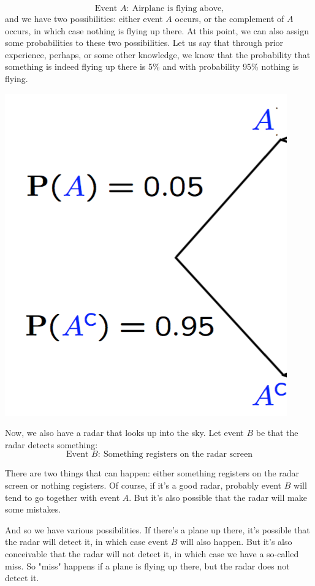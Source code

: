 \documentclass{tufte-handout}
\begin{document}
$$
\text{Event } A: \ \text{Airplane is flying above,}
$$
and we have two possibilities: either event $A$ occurs,
or the complement of $A$ occurs, in which case nothing is flying up there. At this point, we can also assign
some probabilities to these two possibilities. Let us say that through prior experience, perhaps, or some
other knowledge, we know that the probability that something is indeed flying up there is 5\% and with
probability 95\% nothing is flying.


\begin{marginfigure}
  \includegraphics{AirplaneTree1}
\end{marginfigure}


\vspace{0.2cm}
Now, we also have a radar that looks up into the sky. Let event $B$ be that the radar detects something:
$$
\text{Event } B: \ \text{Something registers on the radar screen}
$$

There are two things that can happen:  either
something registers on the radar screen or nothing registers. Of course, if it's a good radar, probably
event $B$ will tend to go together with event $A$. But it's also possible that the radar will make some
mistakes.


And so we have various possibilities. If there's a plane up there, it's possible that the radar will detect it,
in which case event $B$ will also happen. But it's also conceivable that the radar will not detect it, in which
case we have a so-called miss. So "miss" happens if a plane is flying up there, but the radar does not detect
it. 
\end{document}

